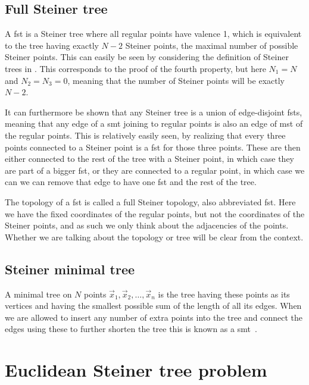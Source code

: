 \subsection{Full Steiner tree}
\label{sec:full-steiner-tree}

A \gls{fst} is a Steiner tree where all regular points have valence 1, which is
equivalent to the tree having exactly $N-2$ Steiner points, the maximal number
of possible Steiner points. This can easily be seen by considering the
definition of Steiner trees in . This corresponds to the
proof of the fourth property, but here $N_1 = N$ and $N_2 = N_3 = 0$, meaning
that the number of Steiner points will be exactly $N-2$.

It can furthermore be shown that any Steiner tree is a union of edge-disjoint
\glspl{fst}, meaning that any edge of a \gls{smt} joining to regular points is
also an edge of \gls{mst} of the regular points. This is relatively easily seen,
by realizing that every three points connected to a Steiner point is a \gls{fst}
for those three points. These are then either connected to the rest of the tree
with a Steiner point, in which case they are part of a bigger \gls{fst}, or they
are connected to a regular point, in which case we can we can remove that edge
to have one \gls{fst} and the rest of the tree.

The topology of a \gls{fst} is called a full Steiner topology, also abbreviated
\gls{fst}. Here we have the fixed coordinates of the regular points, but not the
coordinates of the Steiner points, and as such we only think about the
adjacencies of the points. Whether we are talking about the topology or tree
will be clear from the context.

\subsection{Steiner minimal tree}
\label{sec:steiner-minimal-tree}

A minimal tree on $N$ points $\vec{x}_{1},\vec{x}_{2},\ldots,\vec{x}_{n}$ is the
tree having these points as its vertices and having the smallest possible sum of
the length of all its edges. When we are allowed to insert any number of extra
points into the tree and connect the edges using these to further shorten the
tree this is known as a \gls{smt}~\cite{Gilbert1968}.


\section{Euclidean Steiner tree problem}
\label{sec:eucl-stein-tree}

